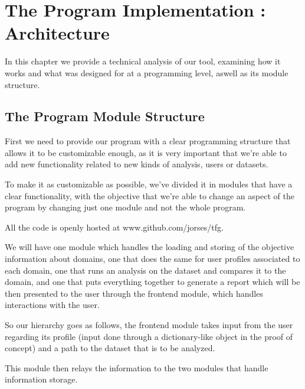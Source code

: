 %
%

\chapter{The Program Implementation : Architecture}


\begin{resumen}
In this chapter we provide a technical analysis of our tool, examining how it works and what was designed for at a programming level, aswell as its module structure.
\end{resumen}


\section{The Program Module Structure}

First we need to provide our program with a clear programming structure that allows it to be customizable enough, as it is very important that we're able to add new functionality related to new kinds of analysis, users or datasets.

To make it as customizable as possible, we've divided it in modules that have a clear functionality, with the objective that we're able to change an aspect of the program by changing just one module and not the whole program.

All the code is openly hosted at www.github.com/jorses/tfg.

We will have one module which handles the loading and storing of the objective information about domains, one that does the same for user profiles associated to each domain, one that runs an analysis on the dataset and compares it to the domain, and one that puts everything together to generate a report which will be then presented to the user through the frontend module, which handles interactions with the user.

So our hierarchy goes as follows, the frontend module takes input from the user regarding its profile (input done through a dictionary-like object in the proof of concept) and a path to the dataset that is to be analyzed.

This module then relays the information to the two modules that handle information storage. 

